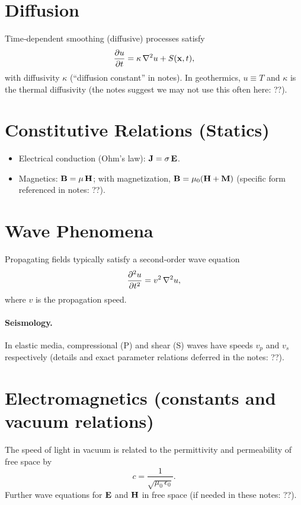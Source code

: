 \documentclass[11pt,a4paper]{article}
\begin{document}
\section{Diffusion}
Time‐dependent smoothing (diffusive) processes satisfy
\begin{equation}
  \pdv{u}{t} = \kappa\,\laplacian u + S(\vb{x},t) ,
\end{equation}
with diffusivity $\kappa$ (``diffusion constant'' in notes). In geothermics, $u\equiv T$ and $\kappa$ is the thermal diffusivity (the notes suggest we may not use this often here: ??).

\section{Constitutive Relations (Statics)}
\begin{itemize}
  \item Electrical conduction (Ohm's law): $\vb{J} = \sigma\,\vb{E}$.
  \item Magnetics: $\vb{B} = \mu\,\vb{H}$; with magnetization, $\vb{B} = \mu_0(\vb{H}+\vb{M})$ (specific form referenced in notes: ??).
\end{itemize}

\section{Wave Phenomena}
Propagating fields typically satisfy a second‐order wave equation
\begin{equation}
  \pdv[2]{u}{t} = v^2\,\nabla^2 u ,
\end{equation}
where $v$ is the propagation speed.

\paragraph{Seismology.} In elastic media, compressional (P) and shear (S) waves have speeds $v_p$ and $v_s$ respectively (details and exact parameter relations deferred in the notes: ??).

\section{Electromagnetics (constants and vacuum relations)}
The speed of light in vacuum is related to the permittivity and permeability of free space by
\begin{equation}
  c = \frac{1}{\sqrt{\mu_0\,\epsilon_0}} .
\end{equation}
Further wave equations for $\vb{E}$ and $\vb{H}$ in free space (if needed in these notes: ??).
\end{document}
